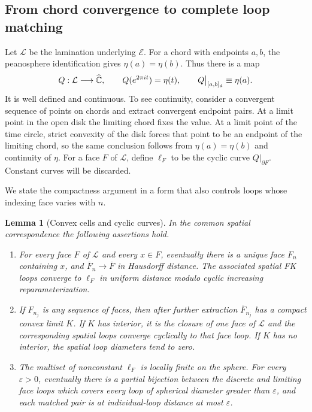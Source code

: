 \documentclass[11pt]{article}
\numberwithin{equation}{section}
\newtheorem{lemma}[theorem]{Lemma}
\theoremstyle{definition}
\theoremstyle{remark}
\newcommand{\Chat}{\widehat{\mathbb C}}
\newcommand{\1}{\mathbf 1}
\begin{document}
\subsection{From chord convergence to complete loop matching}

Let $\mathcal L$ be the lamination underlying $\mathcal E$.  For a chord
with endpoints $a,b$, the peanosphere identification gives
$\eta(a)=\eta(b)$.  Thus there is a map
\[
 Q:\mathcal L\longrightarrow\Chat,
 \qquad Q(e^{2\pi it})=\eta(t),
 \qquad Q\big|_{[a,b]_{\rm d}}\equiv\eta(a).
\]
It is well defined and continuous.  To see continuity, consider a
convergent sequence of points on chords and extract convergent endpoint
pairs.  At a limit point in the open disk the limiting chord fixes the
value.  At a limit point of the time circle, strict convexity of the disk
forces that point to be an endpoint of the limiting chord, so the same
conclusion follows from $\eta(a)=\eta(b)$ and continuity of $\eta$.
For a face $F$ of $\mathcal L$, define $\ell_F$ to be the cyclic curve
$Q|_{\partial F}$.  Constant curves will be discarded.

We state the compactness argument in a form that also controls loops
whose indexing face varies with $n$.

\begin{lemma}[Convex cells and cyclic curves]\label{loop:convex}
In the common spatial correspondence the following assertions hold.
\begin{enumerate}
\item For every face $F$ of $\mathcal L$ and every $x\in F$, eventually
there is a unique face $F_n$ containing $x$, and
$\overline F_n\to\overline F$ in Hausdorff distance.  The associated
spatial FK loops converge to $\ell_F$ in uniform distance modulo cyclic
increasing reparameterization.
\item If $F_{n_j}$ is any sequence of faces, then after further extraction
$\overline F_{n_j}$ has a compact convex limit $K$.  If $K$ has interior,
it is the closure of one face of $\mathcal L$ and the corresponding
spatial loops converge cyclically to that face loop.  If $K$ has no
interior, the spatial loop diameters tend to zero.
\item The multiset of nonconstant $\ell_F$ is locally finite on the sphere.
For every $\varepsilon>0$, eventually there is a partial bijection between
the discrete and limiting face loops which covers every loop of spherical
diameter greater than $\varepsilon$, and each matched pair is at
individual-loop distance at most $\varepsilon$.
\end{enumerate}
\end{lemma}
\end{document}
